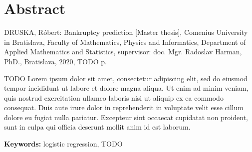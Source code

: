 \thispagestyle{empty}
\section*{Abstract}
DRUSKA, Róbert: Bankruptcy prediction [Master thesis],
Comenius University in Bratislava,
Faculty of Mathematics, Physics and Informatics,
Department of Applied Mathematics and Statistics,
supervisor: doc. Mgr. Radoslav Harman, PhD.,
Bratislava, 2020, TODO p.

TODO Lorem ipsum dolor sit amet, consectetur adipiscing elit, sed do eiusmod tempor incididunt ut labore et dolore magna aliqua. Ut enim ad minim veniam, quis nostrud exercitation ullamco laboris nisi ut aliquip ex ea commodo consequat. Duis aute irure dolor in reprehenderit in voluptate velit esse cillum dolore eu fugiat nulla pariatur. Excepteur sint occaecat cupidatat non proident, sunt in culpa qui officia deserunt mollit anim id est laborum.

\begin{flushleft}
  \textbf{Keywords:} logistic regression, TODO
\end{flushleft}